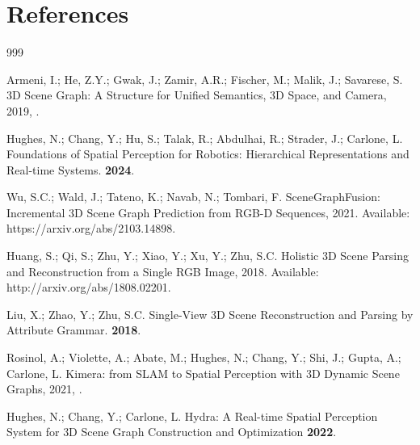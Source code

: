 \documentclass[10pt,a4paper]{article}
\begin{document}
\section*{References}
%
\begin{thebibliography}{999}

Armeni, I.; He, Z.Y.; Gwak, J.; Zamir, A.R.; Fischer, M.; Malik, J.; Savarese,
  S.
\newblock 3D Scene Graph: A Structure for Unified Semantics, 3D Space, and
  Camera,  2019,  \href{http://arxiv.org/abs/1910.02527}{{\normalfont
  [1910.02527]}}.

Hughes, N.; Chang, Y.; Hu, S.; Talak, R.; Abdulhai, R.; Strader, J.; Carlone,
  L.
\newblock Foundations of Spatial Perception for Robotics: Hierarchical
  Representations and Real-time Systems.
 {\bf 2024}.

Wu, S.C.; Wald, J.; Tateno, K.; Navab, N.; Tombari, F.
\newblock SceneGraphFusion: Incremental 3D Scene Graph Prediction from RGB-D
  Sequences,  2021.
\newblock Available: https://arxiv.org/abs/2103.14898.

Huang, S.; Qi, S.; Zhu, Y.; Xiao, Y.; Xu, Y.; Zhu, S.C.
\newblock Holistic 3D Scene Parsing and Reconstruction from a Single RGB Image,
   2018.
\newblock Available: http://arxiv.org/abs/1808.02201.

Liu, X.; Zhao, Y.; Zhu, S.C.
\newblock Single-View 3D Scene Reconstruction and Parsing by Attribute Grammar.
  {\bf 2018}.

Rosinol, A.; Violette, A.; Abate, M.; Hughes, N.; Chang, Y.; Shi, J.; Gupta,
  A.; Carlone, L.
\newblock Kimera: from SLAM to Spatial Perception with 3D Dynamic Scene Graphs,
   2021,  \href{http://arxiv.org/abs/2101.06894}{{\normalfont
  [arXiv:cs.RO/2101.06894]}}.

Hughes, N.; Chang, Y.; Carlone, L.
\newblock Hydra: A Real-time Spatial Perception System for {3D} Scene Graph
  Construction and Optimization {\bf 2022}.


\end{thebibliography}
\end{document}
